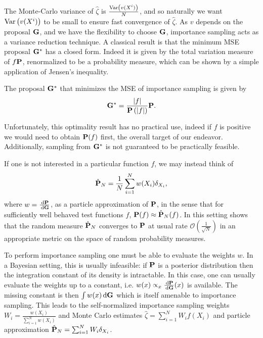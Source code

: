 The Monte-Carlo variance of $\hat \zeta$ is $\frac{\var \left(v(X^{i})\right)}{N}$, and so naturally we want $\var \left(v(X^{i})\right)$ to be small to ensure fast convergence of $\hat \zeta$. As $v$ depends on the proposal $\G$, and we have the flexibility to choose $\G$, importance sampling acts as a variance reduction technique. 
A classical result is that the minimum MSE proposal $\G^\ast$ has a closed form. Indeed it is given by the total variation measure of $f\P$, renormalized to be a probability measure, which can be shown by a simple application of Jensen's inequality. 
\begin{proposition}
    \label{prop:minimum_MSE_IS}
    The proposal $\G^{\ast}$ that minimizes the MSE of importance sampling is given by
    $$
    \G^{\ast}  = \frac{\lvert f \rvert}{\P\left(\lvert f \rvert \right)} \P.
    $$
\end{proposition}
Unfortunately, this optimality result has no practical use, indeed if $f$ is positive we would need to obtain $\P(f)$ first, the overall target of our endeavor. Additionally, sampling from $\G^{\ast}$ is not guaranteed to be practically feasible. 

If one is not interested in a particular function $f$, we may instead think of
\begin{align}
\label{eq:is-particle-approximation}
\hat \P_N = \frac{1}{N} \sum_{i = 1}^{N} w(X_i) \delta_{X_i},
\end{align}
where $w = \frac{\d\P}{\d\G}$, as a particle approximation of $\P$, in the sense that for sufficiently well behaved test functions $f$, $\P (f) \approx \hat\P_{N}(f)$. In this setting \cite{Agapiou2017Importance} shows that the random measure $\hat \P_N$ converges to $\P$ at usual rate $\mathcal O\left(\frac 1 {\sqrt{N}}\right)$ in an appropriate metric on the space of random probability measures. 

To perform importance sampling one must be able to evaluate the weights $w$. In a Bayesian setting, this is usually infeasible: if $\P$ is a posterior distribution then the integration constant of its density is intractable.
In this case, one can usually evaluate the weights up to a constant, i.e. $w(x) \propto_x \frac{\d \P}{\d \G}(x)$  is available. The missing constant is then $\int w(x) \d \G$ which is itself amenable to importance sampling.
 This leads to the self-normalized importance sampling weights $W_i = \frac{w(X_i)}{\sum_{i = 1}^N w(X_i)}$ and Monte Carlo estimates $\hat \zeta = \sum_{i = 1}^{N} W_i f(X_i)$ and particle approximation $\hat \P_N = \sum_{i = 1}^{N} W_i \delta_{X_i}$.

